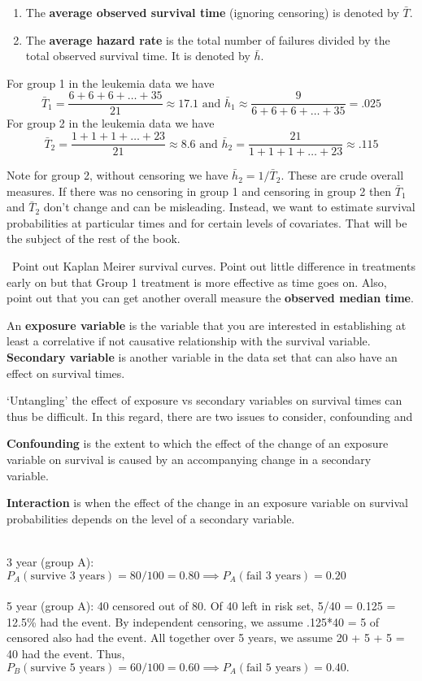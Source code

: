 \documentclass{article}
\begin{document}
\begin{enumerate}
\item The \textbf{average observed survival time }(ignoring censoring) is denoted by $\bar{T}$.
\item The \textbf{average hazard rate} is the total number of failures divided by the total observed survival time. It is denoted by $\bar{h}$.
\end{enumerate}
 For group 1 in the leukemia data we have
\[ \bar{T}_1 = \frac{6 + 6 + 6 + \ldots + 35}{21} \approx 17.1 \text { and } \bar{h}_1 \approx \frac{9}{6 + 6 + 6 + \ldots + 35} = .025
\]
For group 2 in the leukemia data we have
\[ \bar{T}_2 = \frac{1 + 1 + 1 + \ldots + 23}{21} \approx 8.6 \text { and } \bar{h}_2 = \frac{21}{1 + 1 + 1 + \ldots + 23} \approx .115
\]

Note for group 2, without censoring we have $\bar{h}_2 = 1/\bar{T}_2$. These are crude overall measures. If there was no censoring in group 1 and censoring in group 2 then $\bar{T}_1$ and $\bar{T}_2$ don't change and can be misleading. Instead, we want to estimate survival probabilities at particular times and for certain levels of covariates. That will be the subject of the rest of the book.


\NTS \, Point out Kaplan Meirer survival curves. Point out little difference in treatments early on but that Group 1 treatment is more effective as time goes on. Also, point out that you can get another overall measure the \textbf{observed median time}.

 An \textbf{exposure variable} is the variable that you are interested in establishing at least a correlative if not causative relationship with the survival variable. \textbf{Secondary variable} is another variable in the data set that can also have an effect on survival times.

 `Untangling' the effect of exposure vs secondary variables on survival times can thus be difficult. In this regard, there are two issues to consider, confounding and

 \textbf{Confounding } is the extent to which the effect of the change of an exposure variable on survival is caused by an accompanying change in a secondary variable.

 \textbf{Interaction} is when the effect of the change in an exposure variable on survival probabilities depends on the level of a secondary variable.


 \\
3 year (group A): $P_A(\text{survive 3 years})= 80/100 = 0.80 \implies P_A(\text{fail 3 years}) = 0.20$ \\ \\
5 year (group A): 40 censored out of 80. Of 40 left in risk set, 5/40 = 0.125 = 12.5\% had the event. By independent censoring, we assume .125*40 = 5 of censored also had the event. All together over 5 years, we assume 20 + 5 + 5 = 40 had the event. Thus, $P_B(\text{survive 5 years})= 60/100 = 0.60 \implies P_A(\text{fail 5 years}) = 0.40.$ \\
\end{document}
